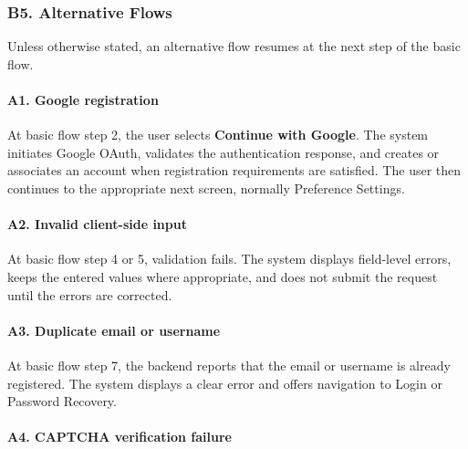 \documentclass[12pt]{article}
\begin{document}
\subsubsection*{B5. Alternative Flows}
\par\medskip

Unless otherwise stated, an alternative flow resumes at the next step of the basic flow.
\par\medskip

\hypertarget{sec:a1-google-registration}{}
\paragraph*{A1. Google registration}
\par\medskip

At basic flow step 2, the user selects \textbf{Continue with Google}. The system initiates Google OAuth, validates the authentication response, and creates or associates an account when registration requirements are satisfied. The user then continues to the appropriate next screen, normally Preference Settings.
\par\medskip

\hypertarget{sec:a2-invalid-client-side-input}{}
\paragraph*{A2. Invalid client-side input}
\par\medskip

At basic flow step 4 or 5, validation fails. The system displays field-level errors, keeps the entered values where appropriate, and does not submit the request until the errors are corrected.
\par\medskip

\hypertarget{sec:a3-duplicate-email-or-username}{}
\paragraph*{A3. Duplicate email or username}
\par\medskip

At basic flow step 7, the backend reports that the email or username is already registered. The system displays a clear error and offers navigation to Login or Password Recovery.
\par\medskip

\hypertarget{sec:a4-captcha-verification-failure}{}
\paragraph*{A4. CAPTCHA verification failure}
\par\medskip
\end{document}

